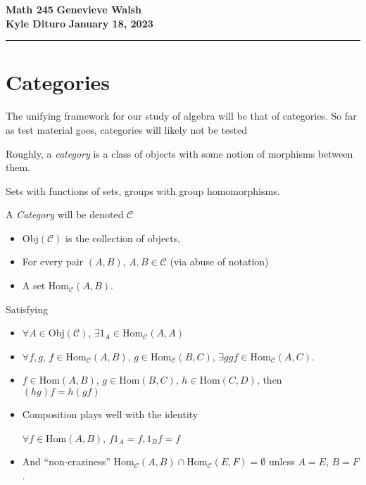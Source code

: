 \documentclass[12pt, twosided]{article}
\begin{document}
\noindent \textbf{Math 245} \hfill \textbf{Genevieve Walsh} \\
\textbf{Kyle Dituro} \hfill \textbf{January 18, 2023}\hrule
\vspace{.2in}

\section{Categories}
The unifying framework for our study of algebra will be that of categories. So far as test material goes, categories will likely not be tested

Roughly, a \textit{category} is a class of objects with some notion of morphisms between them.

\begin{exa}
  Sets with functions of sets, groups with group homomorphisms.
\end{exa}

\begin{df}
  A  \textit{Category} will be denoted \(\mathcal{C}\)
  \begin{itemize}
  \item \(\mathrm{Obj}(\mathcal{C})\) is the collection of objects,
  \item For every pair \((A, B)\), \(A, B \in \mathcal{C}\) (via abuse of notation)
  \item A set \(\mathrm{Hom}_\mathcal{C}(A, B)\).
  \end{itemize}

  Satisfying
  \begin{itemize}
  \item \(\forall A \in \mathrm{Obj}(\mathcal{C})\), \(\exists 1_A \in \mathrm{Hom}_{\mathcal{C}}(A, A)\)
  \item \(\forall f, g\), \(f \in \mathrm{Hom}_\mathcal{C}(A,B)\), \(g \in \mathrm{Hom}_\mathcal{C}(B, C)\), \(\exists ggf \in \mathrm{Hom}_\mathcal{C}(A,C)\).
  \item \(f \in \mathrm{Hom}(A, B)\), \(g \in \mathrm{Hom}(B,C)\), \(h \in \mathrm{Hom}(C, D)\), then \((hg)f = h(gf)\)
  \item Composition plays well with the identity

    \(\forall f \in \mathrm{Hom}(A, B)\), \(f1_A = f, 1_Bf = f\)
  \item And ``non-craziness'' \(\mathrm{Hom}_\mathcal{C}(A,B) \cap \mathrm{Hom}_\mathcal{C}(E, F) = \emptyset\) unless \(A = E\), \(B = F\).
  \end{itemize}
\end{df}
\end{document}
